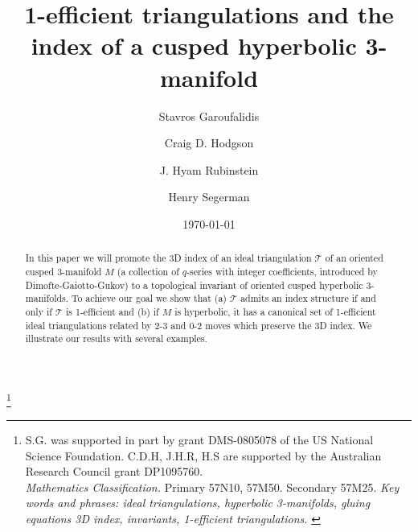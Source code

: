 \documentclass[12pt]{amsart}
\theoremstyle{definition}
\theoremstyle{remark}
\newcommand{\CT}{\mathcal{T}}
\begin{document}

\title[1-efficient triangulations and the index of a cusped hyperbolic 
3-manifold]{1-efficient triangulations and the index of a cusped hyperbolic 
3-manifold}
\author{Stavros Garoufalidis}
\address{School of Mathematics \\
         Georgia Institute of Technology \\
         Atlanta, GA 30332-0160, USA \newline
         {\tt \url{http://www.math.gatech.edu/~stavros }}}
\author{Craig D. Hodgson}
\address{Department of Mathematics and Statistics \\
         The University of Melbourne \\
         Parkville, VIC, 3010, AUSTRALIA
         \tt{\url{http://www.ms.unimelb.edu.au/~cdh }}}
\author{J. Hyam Rubinstein}
\address{Department of Mathematics and Statistics \\
         The University of Melbourne \\
         Parkville, VIC, 3010, AUSTRALIA
         \tt{\url{http://www.ms.unimelb.edu.au/~rubin }}}
\author{Henry Segerman}
\address{Department of Mathematics and Statistics \\
         The University of Melbourne \\
         Parkville, VIC, 3010, AUSTRALIA
         \tt{\url{http://www.ms.unimelb.edu.au/~segerman }}}
\thanks{S.G. was supported in part by grant DMS-0805078 of the US 
National Science Foundation. C.D.H, J.H.R, H.S are supported by the Australian Research Council grant DP1095760.
\\
 {\em Mathematics Classification.} Primary 57N10, 57M50. Secondary 57M25.
\newline
{\em Key words and phrases: ideal triangulations, hyperbolic 3-manifolds, gluing equations
3D index, invariants, 1-efficient triangulations.
}
}

\date{\today }

\begin{abstract}
In this paper we will promote the 3D index of an ideal triangulation $\CT$ 
of an oriented cusped 3-manifold $M$ 
(a collection of $q$-series with integer coefficients, 
introduced by Dimofte-Gaiotto-Gukov) to a topological invariant of oriented cusped
hyperbolic 3-manifolds. To achieve our goal we show that (a) $\CT$ admits an 
index structure if and only if $\CT$ is 1-efficient and 
(b) if $M$ is hyperbolic, it has a canonical set of 1-efficient ideal 
triangulations related by 2-3 and 0-2 moves which preserve the 3D index. 
We illustrate our results with several examples. 
\end{abstract}
\end{document}
